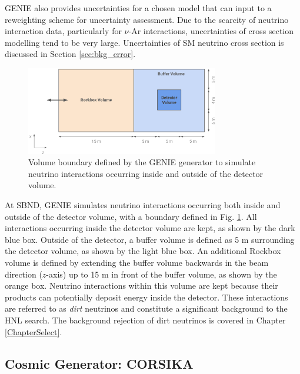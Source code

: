 GENIE also provides uncertainties for a chosen model that can input to a reweighting scheme for uncertainty assessment.
Due to the scarcity of neutrino interaction data, particularly for $\nu$-Ar interactions, uncertainties of cross section modelling tend to be very large. 
Uncertainties of SM neutrino cross section is discussed in Section \ref{sec:bkg_error}.

\begin{figure}[b!] 
\centering    
\includegraphics[width=0.75\textwidth]{Rockbox_Volume}
\caption[Volume Boundary of the GENIE Generator]{
Volume boundary defined by the GENIE generator to simulate neutrino interactions occurring inside and outside of the detector volume. 
}
\label{fig:Rockbox_Volume}
\end{figure}

At SBND, GENIE simulates neutrino interactions occurring both inside and outside of the detector volume, with a boundary defined in Fig. \ref{fig:Rockbox_Volume}.  
All interactions occurring inside the detector volume are kept, as shown by the dark blue box.
Outside of the detector, a buffer volume is defined as 5 m surrounding the detector volume, as shown by the light blue box.                       
An additional Rockbox volume is defined by extending the buffer volume backwards in the beam direction ($z$-axis) up to 15 m in front of the buffer volume, as shown by the orange box.
Neutrino interactions within this volume are kept because their products can potentially deposit energy inside the detector.
These interactions are referred to as \textit{dirt} neutrinos and constitute a significant background to the HNL search.
The background rejection of dirt neutrinos is covered in Chapter \ref{ChapterSelect}.

\subsection{Cosmic Generator: CORSIKA}
\label{sec:gen_corsika}


